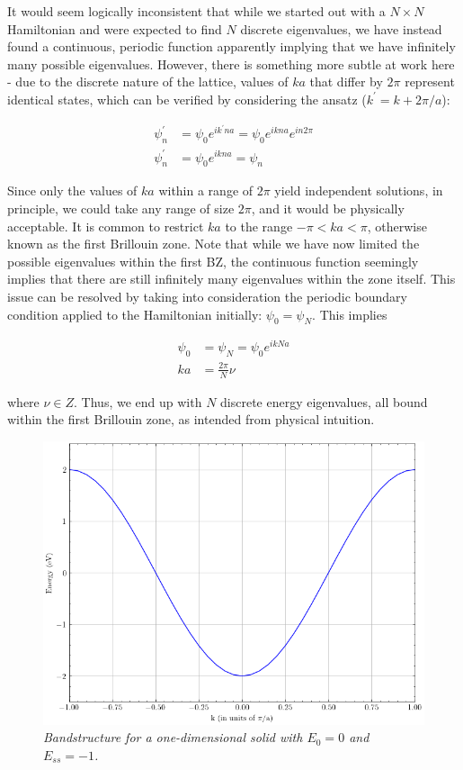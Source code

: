 It would seem logically inconsistent that while we started out with a $N \times N$ Hamiltonian and were expected to find $N$ discrete eigenvalues, we have instead found a continuous, periodic function apparently implying that we have infinitely many possible eigenvalues. However, there is something more subtle at work here - due to the discrete nature of the lattice, values of $ka$ that differ by $2\pi$ represent identical states, which can be verified by considering the ansatz ($k^{'} = k + 2\pi/a$):

\begin{equation*}
\begin{aligned}
    \psi_{n}^{'} &= \psi_{0}e^{ik^{'}na} = \psi_{0}e^{ikna}e^{in2\pi} \\
    \psi_{n}^{'} &= \psi_{0}e^{ikna} = \psi_{n}
\end{aligned}
\end{equation*}

Since only the values of $ka$ within a range of $2\pi$ yield independent solutions, in principle, we could take any range of size $2\pi$, and it would be physically acceptable. It is common to restrict $ka$ to the range $-\pi < ka < \pi$, otherwise known as the first Brillouin zone. Note that while we have now limited the possible eigenvalues within the first BZ, the continuous function seemingly implies that there are still infinitely many eigenvalues within the zone itself. This issue can be resolved by taking into consideration the periodic boundary condition applied to the Hamiltonian initially: $\psi_{0} = \psi_{N}$. This implies

\begin{equation*}
\begin{aligned}
    \psi_{0} &= \psi_{N} = \psi_{0}e^{ikNa} \\
    ka &= \frac{2\pi}{N}\nu
\end{aligned}  
\end{equation*}

where $\nu \in Z$. Thus, we end up with $N$ discrete energy eigenvalues, all bound within the first Brillouin zone, as intended from physical intuition.

\vspace{1cm}

\begin{figure}[h]
\centering
\includegraphics[scale=0.6]{1D_chain.png}
\caption{\textit{Bandstructure for a one-dimensional solid with $E_0 = 0$ and $E_{ss} = -1$.}}
\end{figure}

\vspace{1cm}

